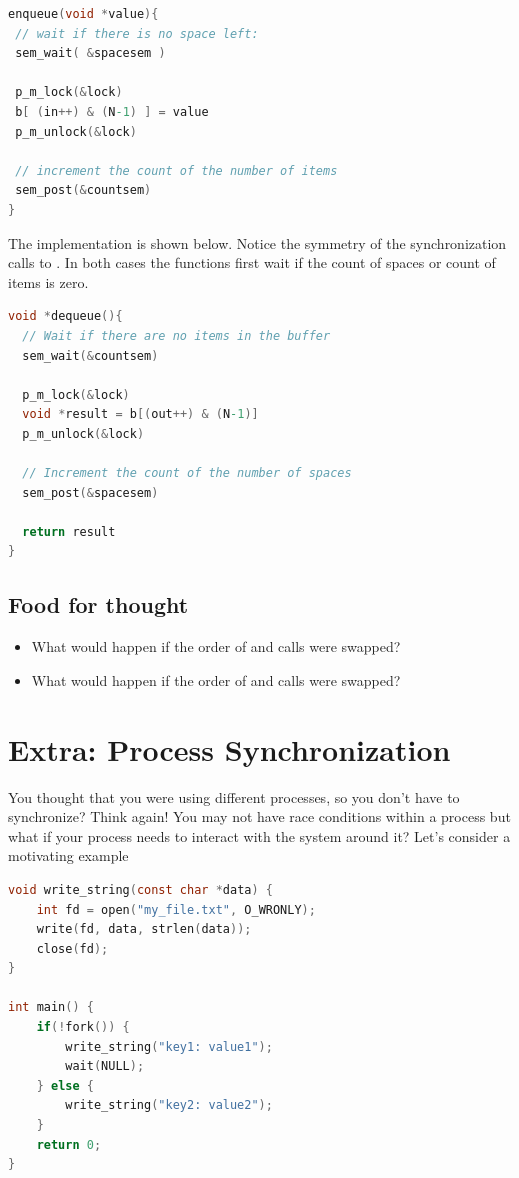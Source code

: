 \begin{lstlisting}[language=C]
enqueue(void *value){
 // wait if there is no space left:
 sem_wait( &spacesem )

 p_m_lock(&lock)
 b[ (in++) & (N-1) ] = value
 p_m_unlock(&lock)

 // increment the count of the number of items
 sem_post(&countsem)
}
\end{lstlisting}

The  implementation is shown below. Notice the symmetry of the synchronization calls to . In both cases the functions first wait if the count of spaces or count of items is zero.

\begin{lstlisting}[language=C]
void *dequeue(){
  // Wait if there are no items in the buffer
  sem_wait(&countsem)

  p_m_lock(&lock)
  void *result = b[(out++) & (N-1)]
  p_m_unlock(&lock)

  // Increment the count of the number of spaces
  sem_post(&spacesem)

  return result
}
\end{lstlisting}

\subsection{Food for thought}\label{food-for-thought}

\begin{itemize}
\tightlist
\item
  What would happen if the order of  and  calls were swapped?
\item
  What would happen if the order of  and  calls were swapped?
\end{itemize}


\section{Extra: Process Synchronization}\label{process-synchronization}

You thought that you were using different processes, so you don't have to synchronize? Think again! You may not have race conditions within a process but what if your process needs to interact with the system around it? Let's consider a motivating example

\begin{lstlisting}[language=C]
void write_string(const char *data) {
    int fd = open("my_file.txt", O_WRONLY);
    write(fd, data, strlen(data));
    close(fd);
}

int main() {
    if(!fork()) {
        write_string("key1: value1");
        wait(NULL);
    } else {
        write_string("key2: value2");
    }
    return 0;
}
\end{lstlisting}

